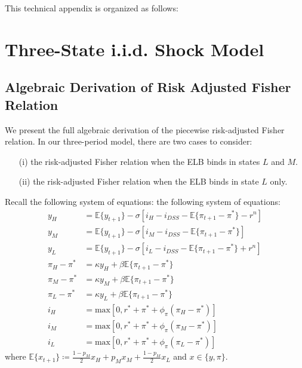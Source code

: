 \documentclass[11pt]{article}
\begin{document}
	\begin{singlespace}
		
		\vspace{2em}
		\noindent This technical appendix is organized as follows:
		
		\section{Three-State i.i.d. Shock Model}\label{A:ThreeStateiid}
		\subsection{Algebraic Derivation of Risk Adjusted Fisher Relation}
		
		We present the full algebraic derivation of the piecewise risk-adjusted Fisher relation. In our three-period model, there are two cases to consider: 
		\begin{enumerate}
			\item[(i)] the risk-adjusted Fisher relation when the ELB binds in states $L$ and $M$.
			\item[(ii)] the risk-adjusted Fisher relation when the ELB binds in state $L$ only.
		\end{enumerate}
		Recall the following system of equations: 
		the following system of equations: 
		\begin{align}
		y_{H} & = \mathbb{E}\{y_{t+1}\} - \sigma\left[i_{H} - i_{DSS} - \mathbb{E}\{\pi_{t+1} - \pi^*\}-r^n\right] \label{eq:EE_H_appx} \\
		y_{M} & = \mathbb{E}\{y_{t+1}\} - \sigma\left[i_{M} - i_{DSS} - \mathbb{E}\{\pi_{t+1} - \pi^*\}\right] \label{eq:EE_M_appx}\\
		y_{L} & = \mathbb{E}\{y_{t+1}\} - \sigma\left[i_{L} - i_{DSS} - \mathbb{E}\{\pi_{t+1} - \pi^*\}+r^n\right] \label{eq:EE_L_appx}\\
		\pi_{H} - \pi^* & = \kappa y_{H} + \beta\mathbb{E}\{\pi_{t+1} - \pi^*\} \label{eq:PC_H_appx}\\
		\pi_{M} - \pi^* & = \kappa y_{M} + \beta\mathbb{E}\{\pi_{t+1} - \pi^*\} \label{eq:PC_M_appx}\\
		\pi_{L} - \pi^* & = \kappa y_{L} + \beta\mathbb{E}\{\pi_{t+1} - \pi^*\} \label{eq:PC_L_appx}\\
		i_{H} & = \text{max}\left[0, r^* + \pi^* +  \phi_{\pi}(\pi_{H} - \pi^*)\right] \label{eq:TR_H_appx}\\
		i_{M} & = \text{max}\left[0, r^* + \pi^* + \phi_{\pi}(\pi_{M} - \pi^*)\right] \label{eq:TR_M_appx}\\
		i_{L} & = \text{max}\left[0, r^* + \pi^* + \phi_{\pi}(\pi_{L} - \pi^*)\right] \label{eq:TR_L_appx}
		\end{align}
		where $\mathbb{E}\{x_{t+1}\} \coloneqq \frac{1-p_M}{2}x_H + p_Mx_M + \frac{1-p_M}{2}x_L$ and $x\in\{y,\pi\}$.
		

\end{singlespace}
\end{document}
